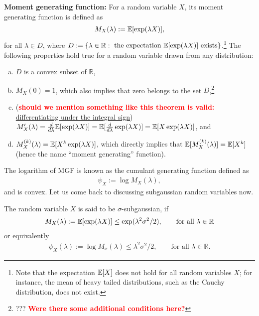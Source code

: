 \documentclass[twoside]{article}
\newcommand{\RR}{\mathbb{R}}
\begin{document}
    \noindent \textbf{Moment generating function:} For a random variable $X$, its moment generating function is defined as
    \begin{align*}
      M_X(\lambda) := \mathbb{E}[\exp(\lambda X)],
    \end{align*}
    for all $\lambda \in D$, where $D := \{ \lambda \in \RR: \text{ the expectation } \EE{\exp(\lambda X)} \text{ exists}\}$.\footnote{Note that the expectation $\mathbb{E}[X]$ does not hold for all random variables $X$; for instance, the mean of heavy tailed distributions, such as the Cauchy distribution, does not exist.} The following properties hold true for a random variable drawn from any distribution:
    \begin{enumerate}[(a)]
    \item $D$ is a convex subset of $\RR$,
    \item $M_X(0) = 1$, which also implies that zero belongs to the set $D$,\footnote{??? \textbf{\textcolor{red}{Were there some additional conditions here?}}}
    \item (\textbf{\textcolor{red}{should we mention something like this theorem is valid:}} \href{https://en.wikipedia.org/wiki/Leibniz_integral_rule#Measure_theory_statement}{differentiating under the integral sign}) $M_X'(\lambda) = \frac{d}{d \lambda} \mathbb{E}[\exp(\lambda X)] = \mathbb{E}[\frac{d}{d \lambda} \exp(\lambda X)] = \mathbb{E}[X \exp(\lambda X)]$, and
    \item $M_X^{(k)}(\lambda) = \mathbb{E}[X^k \exp(\lambda X)]$, which directly implies that $\mathbb{E}[M_X^{(k)}(\lambda)] = \mathbb{E}[X^k]$ (hence the name ``moment generating'' function).
    \end{enumerate}
    The logarithm of MGF is known as the cumulant generating function defined as
    \begin{align*}
      \psi_X := \log M_X(\lambda),
    \end{align*}
    and is convex. Let us come back to discussing subgaussian random variables now.
    \begin{definition}
      The random variable $X$ is said to be $\sigma$-subgaussian, if
      \begin{align*}
        M_X(\lambda) := \EE{\exp(\lambda X)} \leq \exp(\lambda^2 \sigma^2 / 2), \qquad \text{for all } \lambda \in \RR
      \end{align*}
      or equivalently
      \begin{align*}
        \psi_X(\lambda) := \log M_x(\lambda) \leq \lambda^2 \sigma^2 / 2, \qquad \text{for all } \lambda \in \RR.
      \end{align*}
    \end{definition}
\end{document}
